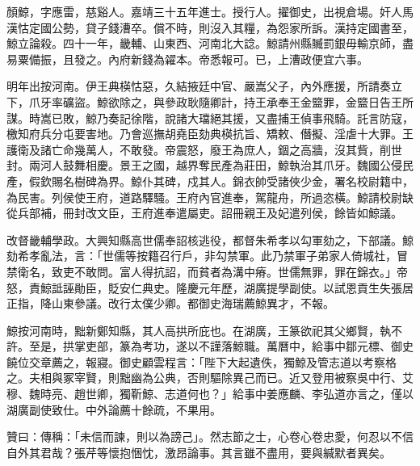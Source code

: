 \begin{pinyinscope}
顏鯨，字應雷，慈谿人。嘉靖三十五年進士。授行人。擢御史，出視倉場。奸人馬漢怙定國公勢，貸子錢漕卒。償不時，則沒入其糧，為怨家所訴。漢持定國書至，鯨立論殺。四十一年，畿輔、山東西、河南北大諗。鯨請州縣贓罰銀毋輸京師，盡易粟備振，且發之。內府新錢為糴本。帝悉報可。已，上漕政便宜六事。

明年出按河南。伊王典楧怙惡，久結掖廷中官、嚴嵩父子，內外應援，所請奏立下，爪牙率礦盜。鯨欲除之，與參政耿隨卿計，持王承奉王金盬罪，金盬日告王所謀。時嵩已敗，鯨乃奏記徐階，說諸大璫絕其援，又盡捕王偵事飛騎。託言防寇，檄知府兵分屯要害地。乃會巡撫胡堯臣劾典楧抗旨、矯敕、僭擬、淫虐十大罪。王護衛及諸亡命幾萬人，不敢發。帝震怒，廢王為庶人，錮之高牆，沒其貲，削世封。兩河人鼓舞相慶。景王之國，越界奪民產為莊田，鯨執治其爪牙。魏國公侵民產，假欽賜名樹碑為界。鯨仆其碑，戍其人。錦衣帥受諸俠少金，署名校尉籍中，為民害。列侯使王府，道路驛騷。王府內官進奉，駕龍舟，所過恣橫。鯨請校尉缺從兵部補，冊封改文臣，王府進奉遣屬吏。詔冊親王及妃遣列侯，餘皆如鯨議。

改督畿輔學政。大興知縣高世儒奉詔核逃役，都督朱希孝以勾軍劾之，下部議。鯨劾希孝亂法，言：「世儒等按籍召行戶，非勾禁軍。此乃禁軍子弟家人倚城社，冒禁衛名，致吏不敢問。富人得抗詔，而貧者為溝中瘠。世儒無罪，罪在錦衣。」帝怒，責鯨詆誣勛臣，貶安仁典史。隆慶元年歷，湖廣提學副使。以試恩貢生失張居正指，降山東參議。改行太僕少卿。都御史海瑞薦鯨異才，不報。

鯨按河南時，黜新鄭知縣，其人高拱所庇也。在湖廣，王篆欲祀其父鄉賢，執不許。至是，拱掌吏部，篆為考功，遂以不謹落鯨職。萬曆中，給事中鄒元標、御史饒位交章薦之，報寢。御史顧雲程言：「陛下大起遺佚，獨鯨及管志道以考察格之。夫相與冢宰賢，則黜幽為公典，否則驅除異己而已。近又登用被察吳中行、艾穆、魏時亮、趙世卿，獨靳鯨、志道何也？」給事中姜應麟、李弘道亦言之，僅以湖廣副使致仕。中外論薦十餘疏，不果用。

贊曰：傳稱：「未信而諫，則以為謗己」。然志節之士，心卷心卷忠愛，何忍以不信自外其君哉？張芹等懷抱悃忱，激昂論事。其言雖不盡用，要與緘默者異矣。


\end{pinyinscope}